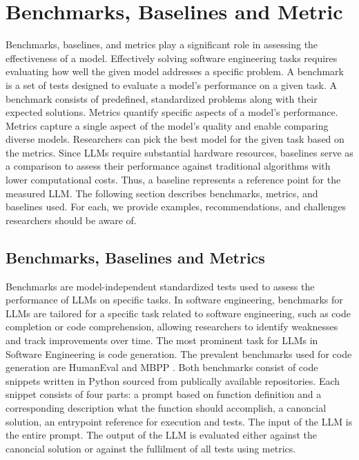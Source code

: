 \documentclass[11pt]{article}
\begin{document}
\section{Benchmarks, Baselines and Metric}
Benchmarks, baselines, and metrics play a significant role in assessing the effectiveness of a model.
Effectively solving software engineering tasks requires evaluating how well the given model addresses a specific problem.
A benchmark is a set of tests designed to evaluate a model's performance on a given task.
A benchmark consists of predefined, standardized problems along with their expected solutions.
Metrics quantify specific aspects of a model's performance.
Metrics capture a single aspect of the model's quality and enable comparing diverse models.
Researchers can pick the best model for the given task based on the metrics.
Since LLMs require substantial hardware resources, baselines serve as a comparison to assess their performance against traditional algorithms with lower computational costs.
Thus, a baseline represents a reference point for the measured LLM.
The following section describes benchmarks, metrics, and baselines used.
For each, we provide examples, recommendations, and challenges researchers should be aware of.

\subsection{Benchmarks, Baselines and Metrics}

Benchmarks are model-independent standardized tests used to assess the performance of LLMs on specific tasks.
In software engineering, benchmarks for LLMs are tailored for a specific task related to software engineering, such as code completion or code comprehension, allowing researchers to identify weaknesses and track improvements over time.
The most prominent task for LLMs in Software Engineering is code generation.
The prevalent benchmarks used for code generation are HumanEval \cite{TODO} and MBPP \cite{MBPP}.
Both benchmarks consist of code snippets written in Python sourced from publically available repositories.
Each snippet consists of four parts: a prompt based on function definition and a corresponding description what the function should accomplish, a canoncial solution, an entrypoint reference for execution and tests.
The input of the LLM is the entire prompt.
The output of the LLM is evaluated either against the canoncial solution or against the fullilment of all tests using metrics.
\end{document}
